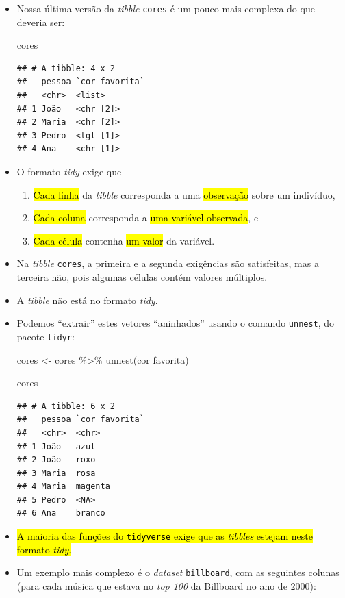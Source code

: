 \documentclass[
  11pt]{report}
\newenvironment{Shaded}{\begin{snugshade}}{\end{snugshade}}
\newcommand{\AttributeTok}[1]{\textcolor[rgb]{0.77,0.63,0.00}{#1}}
\newcommand{\FunctionTok}[1]{\textcolor[rgb]{0.00,0.00,0.00}{#1}}
\newcommand{\NormalTok}[1]{#1}
\newcommand{\OtherTok}[1]{\textcolor[rgb]{0.56,0.35,0.01}{#1}}
\newcommand{\SpecialCharTok}[1]{\textcolor[rgb]{0.00,0.00,0.00}{#1}}
\newcommand{\StringTok}[1]{\textcolor[rgb]{0.31,0.60,0.02}{#1}}
\renewenvironment{Shaded}{
    \begin{mdframed}[%
      roundcorner=2pt,%
      innerleftmargin=5pt,%
      innerrightmargin=5pt,%
      topline=true,%
      leftline=true,%
      rightline=true,%
      bottomline=true,%
      linewidth=0.5pt,%
      linecolor=black!20,%
      backgroundcolor=black!2,%
      skipabove=2ex,%
      skipbelow=2.5ex%
    ]%
  }
  {
    \end{mdframed}
  }
\begin{document}
\begin{itemize}
\item
  Nossa última versão da \emph{tibble} \texttt{cores} é um pouco mais complexa do que deveria ser:

\begin{Shaded}
\begin{Highlighting}[]
\NormalTok{cores}
\end{Highlighting}
\end{Shaded}

\begin{verbatim}
## # A tibble: 4 x 2
##   pessoa `cor favorita`
##   <chr>  <list>        
## 1 João   <chr [2]>     
## 2 Maria  <chr [2]>     
## 3 Pedro  <lgl [1]>     
## 4 Ana    <chr [1]>
\end{verbatim}
\item
  O formato \emph{tidy} exige que

  \begin{enumerate}
  \def\labelenumi{\arabic{enumi}.}
  \item
    {\hl{Cada linha}} da \emph{tibble} corresponda a uma {\hl{observação}} sobre um indivíduo,
  \item
    {\hl{Cada coluna}} corresponda a {\hl{uma variável observada}}, e
  \item
    {\hl{Cada célula}} contenha {\hl{um valor}} da variável.
  \end{enumerate}
\item
  Na \emph{tibble} \texttt{cores}, a primeira e a segunda exigências são satisfeitas, mas a terceira não, pois algumas células contém valores múltiplos.
\item
  A \emph{tibble} não está no formato \emph{tidy}.
\item
  Podemos ``extrair'' estes vetores ``aninhados'' usando o comando \texttt{unnest}, do pacote \texttt{tidyr}:

\begin{Shaded}
\begin{Highlighting}[]
\NormalTok{cores }\OtherTok{\textless{}{-}}\NormalTok{ cores }\SpecialCharTok{\%\textgreater{}\%} 
  \FunctionTok{unnest}\NormalTok{(}\StringTok{\textasciigrave{}}\AttributeTok{cor favorita}\StringTok{\textasciigrave{}}\NormalTok{)}

\NormalTok{cores}
\end{Highlighting}
\end{Shaded}

\begin{verbatim}
## # A tibble: 6 x 2
##   pessoa `cor favorita`
##   <chr>  <chr>         
## 1 João   azul          
## 2 João   roxo          
## 3 Maria  rosa          
## 4 Maria  magenta       
## 5 Pedro  <NA>          
## 6 Ana    branco
\end{verbatim}
\item
  {\hl{A maioria das funções do {\mbox{\texttt{tidyverse}}} exige que as \emph{tibbles} estejam neste formato \emph{tidy}.}}
\item
  Um exemplo mais complexo é o \emph{dataset} \texttt{billboard}, com as seguintes colunas (para cada música que estava no \emph{top 100} da Billboard no ano de $2000$):


\end{itemize}
\end{document}

